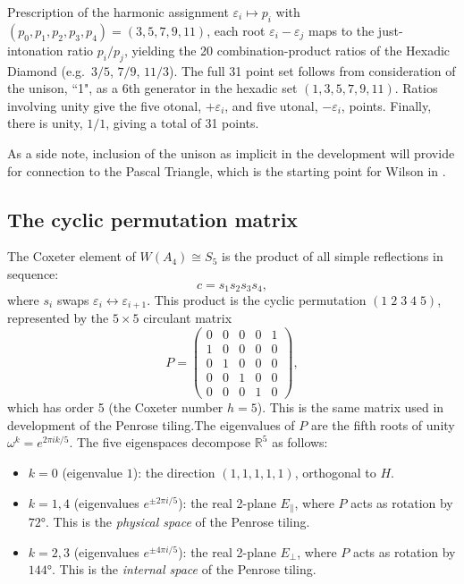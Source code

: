 \documentclass[11pt]{article}
\begin{document}
Prescription of the harmonic assignment $\varepsilon_i \mapsto p_i$ with
$(p_0,p_1,p_2,p_3,p_4) = (3,5,7,9,11)$, each root $\varepsilon_i - \varepsilon_j$
maps to the just-intonation ratio $p_i / p_j$, yielding the 20 combination-product
ratios of the Hexadic Diamond (e.g.\ $3/5$, $7/9$, $11/3$). The full 31 point set
follows from consideration of the unison, ``1", as a 6th generator in the hexadic
set $(1, 3, 5, 7, 9, 11)$. Ratios involving unity give the five otonal, $+\varepsilon_{i}$, and
five utonal, $-\varepsilon_{i}$, points. Finally, there is unity, $1/1$, giving a total of 31 points.

\color{black} 
As a side note, inclusion of the unison as implicit in the development will provide for connection to the Pascal Triangle, which is the starting point for Wilson in \cite{wilson1989}.
\color{blue}

\subsection{The cyclic permutation matrix}

The Coxeter element of $W(A_4) \cong S_5$ is the product of all simple
reflections in sequence:
\[
  c = s_1 s_2 s_3 s_4,
\]
where $s_i$ swaps $\varepsilon_i \leftrightarrow \varepsilon_{i+1}$. This
product is the cyclic permutation $(1\;2\;3\;4\;5)$, represented by the
$5\times 5$ circulant matrix
\[
  P = \begin{pmatrix}
    0 & 0 & 0 & 0 & 1 \\
    1 & 0 & 0 & 0 & 0 \\
    0 & 1 & 0 & 0 & 0 \\
    0 & 0 & 1 & 0 & 0 \\
    0 & 0 & 0 & 1 & 0
  \end{pmatrix},
\]
which has order 5 (the Coxeter number $h = 5$).  This is the same matrix used in
development of the Penrose tiling.The eigenvalues of $P$ are the fifth roots of unity $\omega^k = e^{2\pi i k/5}$.
The five eigenspaces decompose $\mathbb{R}^5$ as follows:
\begin{itemize}
  \item $k=0$ (eigenvalue $1$): the direction $(1,1,1,1,1)$, orthogonal to $H$.
  \item $k=1,4$ (eigenvalues $e^{\pm 2\pi i/5}$): the real 2-plane $E_\parallel$,
        where $P$ acts as rotation by $72°$. This is the \emph{physical space}
        of the Penrose tiling.
  \item $k=2,3$ (eigenvalues $e^{\pm 4\pi i/5}$): the real 2-plane $E_\perp$,
        where $P$ acts as rotation by $144°$. This is the \emph{internal space}
        of the Penrose tiling.
\end{itemize}
\end{document}
